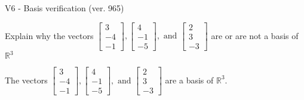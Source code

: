 \begin{exercise}
  \begin{exerciseTitle}V6 - Basis verification (ver. 965)\end{exerciseTitle}
  \begin{exerciseStatement}
    Explain why the vectors \(\left[\begin{array}{r}
3 \\
-4 \\
-1
\end{array}\right] , \left[\begin{array}{r}
4 \\
-1 \\
-5
\end{array}\right] , \text{ and } \left[\begin{array}{r}
2 \\
3 \\
-3
\end{array}\right]\) are or are not a basis of \(\mathbb{R}^3\)	


  \end{exerciseStatement}
  \begin{exerciseAnswer}
   The vectors \(\left[\begin{array}{r}
3 \\
-4 \\
-1
\end{array}\right] , \left[\begin{array}{r}
4 \\
-1 \\
-5
\end{array}\right] , \text{ and } \left[\begin{array}{r}
2 \\
3 \\
-3
\end{array}\right]\) 
  	 are  a basis of \(\mathbb{R}^3\).
  


  \end{exerciseAnswer}
\end{exercise}